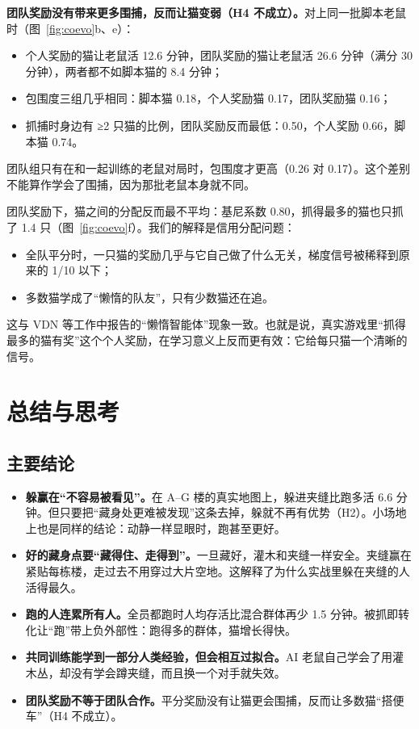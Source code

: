 \documentclass[a4paper,zihao=5,fontset=fandol,UTF8]{ctexart}
\begin{document}
\textbf{团队奖励没有带来更多围捕，反而让猫变弱（H4 不成立）。}对上同一批脚本老鼠时（图~\ref{fig:coevo}b、e）：
\begin{itemize}
  \item 个人奖励的猫让老鼠活 12.6 分钟，团队奖励的猫让老鼠活 26.6 分钟（满分 30 分钟），两者都不如脚本猫的 8.4 分钟；
  \item 包围度三组几乎相同：脚本猫 0.18，个人奖励猫 0.17，团队奖励猫 0.16；
  \item 抓捕时身边有 ≥2 只猫的比例，团队奖励反而最低：0.50，个人奖励 0.66，脚本猫 0.74。
\end{itemize}

团队组只有在和一起训练的老鼠对局时，包围度才更高（0.26 对 0.17）。这个差别不能算作学会了围捕，因为那批老鼠本身就不同。

团队奖励下，猫之间的分配反而最不平均：基尼系数 0.80，抓得最多的猫也只抓了 1.4 只（图~\ref{fig:coevo}f）。我们的解释是信用分配问题：
\begin{itemize}
  \item 全队平分时，一只猫的奖励几乎与它自己做了什么无关，梯度信号被稀释到原来的 1/10 以下；
  \item 多数猫学成了“懒惰的队友”，只有少数猫还在追。
\end{itemize}
这与 VDN 等工作中报告的“懒惰智能体”现象一致\cite{sunehag2018}。也就是说，真实游戏里“抓得最多的猫有奖”这个个人奖励，在学习意义上反而更有效：它给每只猫一个清晰的信号。

\section{总结与思考}
\subsection{主要结论}
\begin{itemize}
  \item \textbf{躲赢在“不容易被看见”。}在 A–G 楼的真实地图上，躲进夹缝比跑多活 6.6 分钟。但只要把“藏身处更难被发现”这条去掉，躲就不再有优势（H2）。小场地上也是同样的结论：动静一样显眼时，跑甚至更好。
  \item \textbf{好的藏身点要“藏得住、走得到”。}一旦藏好，灌木和夹缝一样安全。夹缝赢在紧贴每栋楼，走过去不用穿过大片空地。这解释了为什么实战里躲在夹缝的人活得最久。
  \item \textbf{跑的人连累所有人。}全员都跑时人均存活比混合群体再少 1.5 分钟。被抓即转化让“跑”带上负外部性：跑得多的群体，猫增长得快。
  \item \textbf{共同训练能学到一部分人类经验，但会相互过拟合。}AI 老鼠自己学会了用灌木丛，却没有学会蹲夹缝，而且换一个对手就失效。
  \item \textbf{团队奖励不等于团队合作。}平分奖励没有让猫更会围捕，反而让多数猫“搭便车”（H4 不成立）。
\end{itemize}
\end{document}
